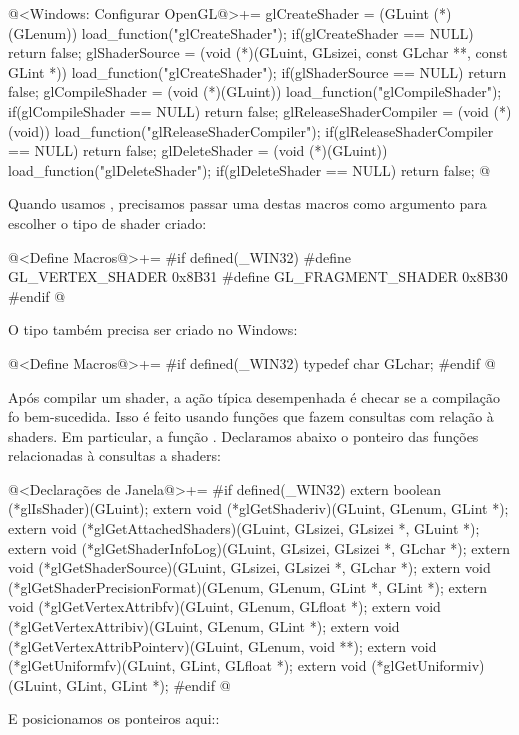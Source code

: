 \iniciocodigo
@<Windows: Configurar OpenGL@>+=
glCreateShader = (GLuint (*)(GLenum)) load_function("glCreateShader");
if(glCreateShader == NULL)
  return false;
glShaderSource = (void (*)(GLuint, GLsizei, const GLchar **, const GLint *))
                    load_function("glCreateShader");
if(glShaderSource == NULL)
  return false;
glCompileShader = (void (*)(GLuint)) load_function("glCompileShader");
if(glCompileShader == NULL)
  return false;
glReleaseShaderCompiler = (void (*)(void))
                             load_function("glReleaseShaderCompiler");
if(glReleaseShaderCompiler == NULL)
  return false;
glDeleteShader = (void (*)(GLuint)) load_function("glDeleteShader");
if(glDeleteShader == NULL)
  return false;
@
\fimcodigo

Quando usamos , precisamos passar uma
destas macros como argumento para escolher o tipo de shader criado:

\iniciocodigo
@<Define Macros@>+=
#if defined(_WIN32)
#define GL_VERTEX_SHADER          0x8B31
#define GL_FRAGMENT_SHADER        0x8B30
#endif
@
\fimcodigo

O tipo  também precisa ser criado no Windows:

\iniciocodigo
@<Define Macros@>+=
#if defined(_WIN32)
typedef char  GLchar;
#endif
@
\fimcodigo

Após compilar um shader, a ação típica desempenhada é checar se a
compilação fo bem-sucedida. Isso é feito usando funções que fazem
consultas com relação à shaders. Em particular, a
função . Declaramos abaixo o ponteiro das
funções relacionadas à consultas a shaders:

\iniciocodigo
@<Declarações de Janela@>+=
#if defined(_WIN32)
extern boolean (*glIsShader)(GLuint);
extern void (*glGetShaderiv)(GLuint, GLenum, GLint *);
extern void (*glGetAttachedShaders)(GLuint, GLsizei, GLsizei *, GLuint *);
extern void (*glGetShaderInfoLog)(GLuint, GLsizei, GLsizei *, GLchar *);
extern void (*glGetShaderSource)(GLuint, GLsizei, GLsizei *, GLchar *);
extern void (*glGetShaderPrecisionFormat)(GLenum, GLenum, GLint *, GLint *);
extern void (*glGetVertexAttribfv)(GLuint, GLenum, GLfloat *);
extern void (*glGetVertexAttribiv)(GLuint, GLenum, GLint *);
extern void (*glGetVertexAttribPointerv)(GLuint, GLenum, void **);
extern void (*glGetUniformfv)(GLuint, GLint, GLfloat *);
extern void (*glGetUniformiv)(GLuint, GLint, GLint *);
#endif
@
\fimcodigo

E posicionamos os ponteiros aqui::


